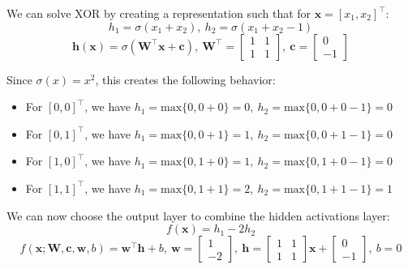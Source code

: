 \documentclass{article}
\begin{document}
{\color{blue} 
We can solve XOR by creating a representation such that for $\mathbf{x}=[x_1,x_2]^{\top}$:
\begin{equation}
    h_1= \sigma(x_1+x_2), \ h_2= \sigma(x_1+x_2-1) 
\end{equation}
\begin{equation}
    \mathbf{h}(\mathbf{x})= \sigma( \mathbf{W}^{\top} \mathbf{x}+ \mathbf{c}), \ \mathbf{W}^{\top}= 
    \begin{bmatrix}
         1&1\\
         1&1
    \end{bmatrix}
    , \ \mathbf{c}= 
    \begin{bmatrix}
         0\\
         -1
    \end{bmatrix}
\end{equation}

Since $\sigma(x)=x^2$, this creates the following behavior:
\begin{itemize}
    \item For $[0,0]^{\top}$, we have $h_1= \text{max}\{0,0+0\}= 0, \ h_2=  \text{max}\{0,0+0-1\}= 0$ 
    \item For $[0,1]^{\top}$, we have $h_1= \text{max}\{0,0+1\}= 1, \ h_2=  \text{max}\{0,0+1-1\}= 0$ 
    \item For $[1,0]^{\top}$, we have $h_1= \text{max}\{0,1+0\}= 1, \ h_2=  \text{max}\{0,1+0-1\}= 0$ 
    \item For $[1,1]^{\top}$, we have $h_1= \text{max}\{0,1+1\}= 2, \ h_2=  \text{max}\{0,1+1-1\}= 1$ 
\end{itemize}

We can now choose the output layer to combine the hidden activations layer:
\begin{equation}
    f(\mathbf{x})= h_1-2h_2
\end{equation}
\begin{equation}
    f(\mathbf{x};\mathbf{W}, \mathbf{c}, \bm{w},b)= \bm{w}^{\top} \mathbf{h}+b, \ \bm{w}= 
    \begin{bmatrix}
        1\\
        -2
    \end{bmatrix} 
    , \ \mathbf{h}= 
    \begin{bmatrix}
        1&1\\
        1&1
    \end{bmatrix} 
    \mathbf{x}+ 
    \begin{bmatrix}
        0\\
        -1
    \end{bmatrix}
    , \ b= 0
\end{equation}

}
\end{document}
